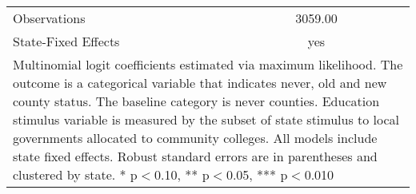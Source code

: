 \begin{table}[!htbp]
\begin{tabular}{l*{2}{c}}
\hline
Observations        &     3059.00   &               \\
State-Fixed Effects &         yes   &               \\
\hline\hline
\multicolumn{3}{p{\linewidth}}{\footnotesize Multinomial logit coefficients estimated via maximum likelihood. The outcome is a categorical variable that indicates  never, old and new county status. The baseline category is never counties. Education stimulus variable is measured by the subset of state stimulus to local governments allocated to community colleges. All models include state fixed effects. Robust standard errors are in parentheses and clustered by state. * p$<$0.10, ** p$<$0.05, *** p$<$0.010}\\
\end{tabular}
\end{table}
